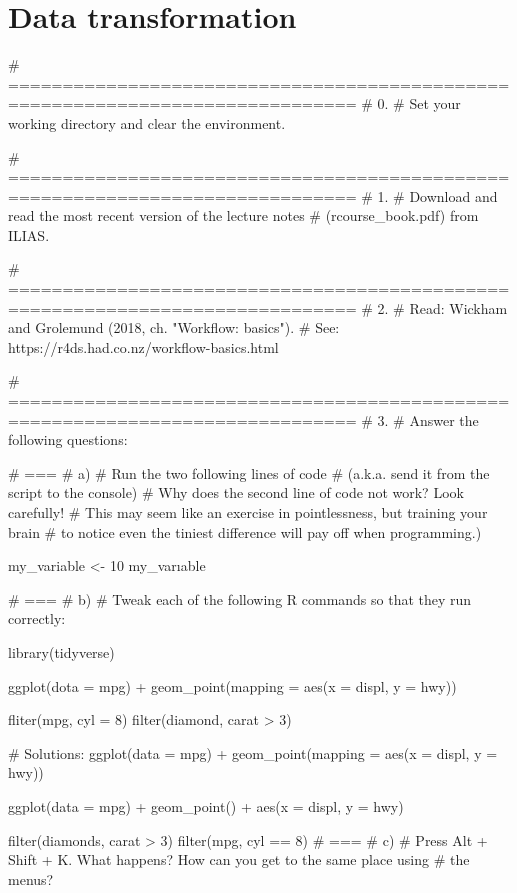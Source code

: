 


\section{Data transformation}


\begin{rblock1}
# ==============================================================================
# 0. 
# Set your working directory and clear the environment.

# ==============================================================================
# 1. 
# Download and read the most recent version of the lecture notes 
# (rcourse_book.pdf) from ILIAS.

# ==============================================================================
# 2. 
# Read: Wickham and Grolemund (2018, ch. "Workflow: basics"). 
# See: https://r4ds.had.co.nz/workflow-basics.html 

# ==============================================================================
# 3. 
# Answer the following questions:

# ===
# a) 
# Run the two following lines of code 
# (a.k.a. send it from the script to the console)
# Why does the second line of code not work? Look carefully! 
# This may seem like an exercise in pointlessness, but training your brain
# to notice even the tiniest difference will pay off when programming.)

my_variable <- 10
my_varıable

# ===
# b)
# Tweak each of the following R commands so that they run correctly:

library(tidyverse)

ggplot(dota = mpg) +
geom_point(mapping = aes(x = displ, y = hwy))

fliter(mpg, cyl = 8)
filter(diamond, carat > 3)

# Solutions:
ggplot(data = mpg) +
geom_point(mapping = aes(x = displ, y = hwy))

ggplot(data = mpg) + 
geom_point() +
aes(x = displ, y = hwy)

filter(diamonds, carat > 3)
filter(mpg, cyl == 8)
# ===
# c)
# Press Alt + Shift + K. What happens? How can you get to the same place using
# the menus?


\end{rblock1}
